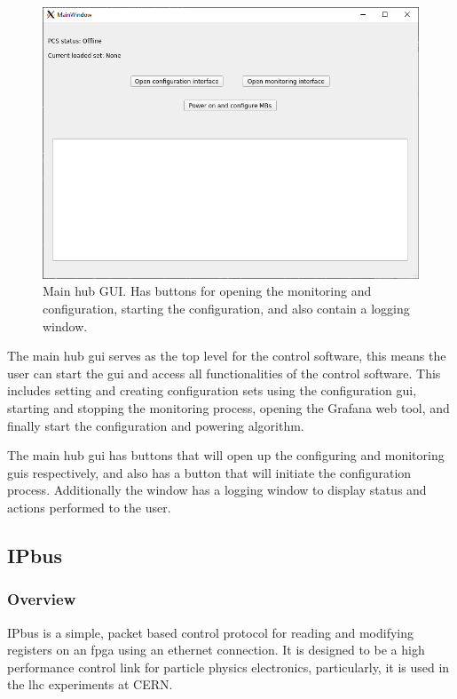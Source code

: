 \documentclass[main.tex]{subfiles}
\begin{document}
\begin{figure}[!htpb]
    \centering
    \includegraphics[scale=0.65]{images/main_gui.png}
    \caption{Main hub GUI. Has buttons for opening the monitoring and configuration, starting the configuration, and also contain a logging window.}
    \label{fig: main_gui}
\end{figure}
\FloatBarrier 

The main hub \gls{gui} serves as the top level for the control software, this means the user can start the \gls{gui} and access all functionalities of the control software. This includes setting and creating configuration sets using the configuration \gls{gui}, starting and stopping the monitoring process, opening the Grafana web tool, and finally start the configuration and powering algorithm.

The main hub \gls{gui} has buttons that will open up the configuring and monitoring \gls{gui}s respectively, and also has a button that will initiate the configuration process. Additionally the window has a logging window to display status and actions performed to the user.


\subsection{IPbus}
\label{ssec: IPbus}
 \subsubsection{Overview}
 
 IPbus is a simple, packet based control protocol for reading and modifying registers on an \gls{fpga} using an ethernet connection. It is designed to be a high performance control link for particle physics electronics, particularly, it is used in the \gls{lhc} experiments at CERN.
 
\end{document}
